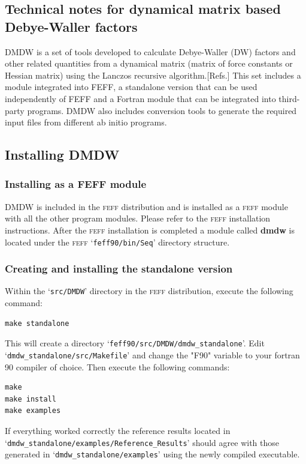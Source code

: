 \documentclass[11pt,oneside]{report} %
\newcommand{\program}[1]{\textsc{#1}}
\newcommand{\feff}{\program{feff}}
\newcommand{\file}[1]{`\texttt{#1}'}
\newcommand{\module}[1]{\textrm{\bf{#1}}}
\begin{document}
\begin{latexonly}

\chapter{Technical notes for dynamical matrix based Debye-Waller factors}
\label{sec:Append-G-DMDW}
DMDW is a set of tools developed to calculate Debye-Waller (DW) factors and
other related quantities from a dynamical matrix (matrix of force constants or
Hessian matrix) using the Lanczos recursive algorithm.[Refs.] This set includes
a module integrated into FEFF, a standalone version that can be used
independently of FEFF and a Fortran module that can be integrated into
third-party programs. DMDW also includes conversion tools to generate the
required input files from different ab initio programs.

\section{Installing DMDW}
\label{sec:Append-G-DMDW-Install}
\subsection{Installing as a FEFF module}
DMDW is included in the {\feff} distribution and is installed as a {\feff} module with all the other program modules.
Please refer to the {\feff} installation instructions. After the {\feff} installation is completed a
module called \module{dmdw} is located under the {\feff} \file{feff90/bin/Seq} directory structure.

\subsection{Creating and installing the standalone version}
Within the \file{src/DMDW} directory in the {\feff} distribution, execute the following
command:
\begin{verbatim}
make standalone
\end{verbatim}
This will create a directory \file{feff90/src/DMDW/dmdw\_standalone}. Edit \file{dmdw\_standalone/src/Makefile}
and change the "F90" variable to your fortran 90 compiler of choice. Then execute the following commands:
\begin{verbatim}
make
make install
make examples
\end{verbatim}
If everything worked correctly the reference results located in
\file{dmdw\_standalone/examples/Reference\_Results} should agree with those generated
in \file{dmdw\_standalone/examples} using the newly compiled executable.


\end{latexonly}
\end{document}
